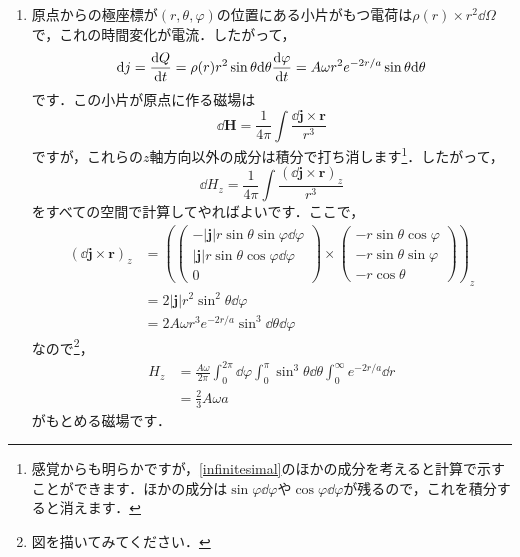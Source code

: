 \documentclass[a4paper,pdflatex,ja=standard]{bxjsarticle}
\begin{document}
\begin{enumerate}
  \item 
  原点からの極座標が$(r,\theta,\varphi)$の位置にある小片がもつ電荷は$\rho(r)\times r^2\dd \Omega$で，これの時間変化が電流．したがって，
  \begin{equation}
    \dd j
    =
    \dv{Q}{t}
    =
    \rho(r)
    r^2\sin\theta\dd \theta
    \dv{\varphi}{t}
    =
    A\omega r^2 e^{-2r/a}\sin\theta\dd \theta
  \end{equation}
  です．この小片が原点に作る磁場は
  \begin{equation}
    \dd \bm{H}
    =
    \frac{1}{4\pi}\int\frac{\dd \bm{j}\times \bm{r}}{r^3}
  \end{equation}
  ですが，これらの$z$軸方向以外の成分は積分で打ち消します\footnote{
    感覚からも明らかですが，\eqref{infinitesimal}のほかの成分を考えると計算で示すことができます．ほかの成分は$\sin\varphi\dd\varphi$や$\cos\varphi\dd\varphi$が残るので，これを積分すると消えます．
  }．したがって，
  \begin{equation}
    \dd H_z
    =
    \frac{1}{4\pi}\int\frac{(\dd \bm{j}\times \bm{r})_z}{r^3}
  \end{equation}
  をすべての空間で計算してやればよいです．ここで，
  \begin{align}
    (\dd \bm{j}\times \bm{r})_z
    &=
    \left(  
      \begin{pmatrix}
        -|\bm{j}|r\sin\theta\sin\varphi\dd \varphi\\
        |\bm{j}|r\sin\theta\cos\varphi\dd \varphi\\
        0
      \end{pmatrix}
      \times
      \begin{pmatrix}
        -r\sin\theta\cos\varphi \\
        -r\sin\theta\sin\varphi \\
        -r\cos\theta
      \end{pmatrix}
    \right)_z
    \nonumber
    \\
    &=
    2|\bm{j}|r^2\sin^2\theta\dd\varphi
    \nonumber
    \\
    &=
    2A\omega r^3 e^{-2r/a}\sin^3\dd \theta\dd \varphi
    \label{infinitesimal}
  \end{align}
  なので\footnote{
    図を描いてみてください．
  }，
  \begin{align}
    H_z
    &=
    \frac{A\omega}{2\pi}
    \int_{0}^{2\pi}\dd \varphi
    \int_{0}^{\pi}\sin^3\theta\dd \theta
    \int_{0}^{\infty}e^{-2r/a}\dd r
    \nonumber
    \\
    &=
    \frac{2}{3}A\omega a
  \end{align}
  がもとめる磁場です．

\end{enumerate}
\end{document}
